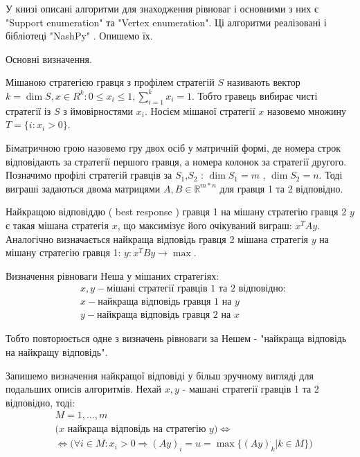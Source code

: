 У книзі \cite{AlgoGameTheory} описані алгоритми для знаходження рівноваг і основними з них є "Support enumeration" та "Vertex enumeration". Ці алгоритми реалізовані і бібліотеці "NashPy" \cite{NashPy}. Опишемо їх.

Основні визначення.

Мішаною стратегією гравця з профілем стратегій $S$ називають вектор $k = \dim S, x \in R^{k} : 0 \le x_i \le 1, \sum_{i=1}^{k} x_i = 1$. Тобто гравець вибирає чисті стратегії із $S$ з ймовірностями $x_i$. Носієм мішаної стратегії $x$ назовемо множину $T=\{ i: x_i > 0\}$.

Біматричною грою назовемо гру двох осіб у матричній формі, де номера строк відповідають за стратегії першого гравця, а номера колонок за стратегії другого. Позначимо профілі стратегій гравців за $S_1$,$S_2$ : $\dim {S_1} = m$ , $\dim {S_2} = n$. Тоді виграші задаються двома матрицями $A,B \in \mathbb{R}^{m*n}$ для гравця 1 та 2 відповідно.

Найкращою відповіддю ( best response ) гравця 1 на мішану стратегію гравця 2 $y$ є такая мішана стратегія $x$, що максимізує його очікуваний виграш: $x^TAy$. Аналогічно визначається найкраща відповідь гравця 2 мішана стратегія $y$ на мішану стратегію гравця 1: $y: x^TBy \rightarrow \max$.

Визначення рівноваги Неша у мішаних стратегіях:
\begin{equation}
	\begin{aligned}
		& x,y - \textrm{мішані стратегії гравців 1 та 2 відповідно}: \\
		& x - \textrm{найкраща відповідь гравця 1 на } y \\
		& y - \textrm{найкраща відповідь гравця 2 на } x
	\end{aligned}
\end{equation}

Тобто повторюється одне з визначень рівноваги за Нешем - "найкраща відповідь на найкращу відповідь".

Запишемо визначення найкращої відповіді у більш зручному вигляді для подальших описів алгоритмів. Нехай $x,y$ - машані стратегії гравців 1 та 2 відповідно, тоді:
\begin{equation}
	\begin{aligned}
		& M = {1,\ldots,m} \\
		& \bigg( x \textrm{ найкраща відповідь на стратегію } y  \bigg)\Leftrightarrow \\
		& \Leftrightarrow \bigg( \forall i \in M: x_i > 0 \Rightarrow (Ay)_i = u = \max\{(Ay)_k | k \in M\} \bigg)
	\end{aligned}
	\label{eq:best_response}
\end{equation}

